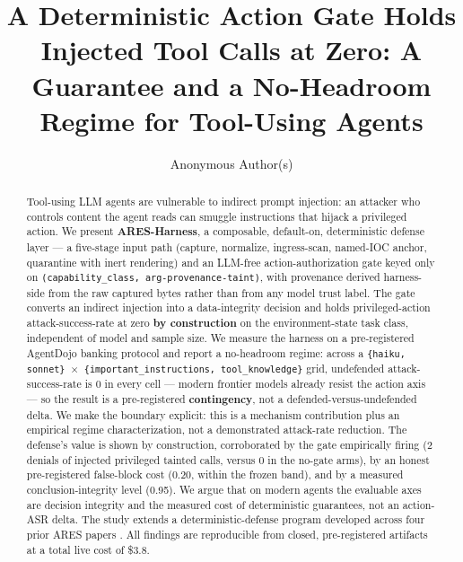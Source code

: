 \documentclass[sigconf,anonymous,review]{acmart}
\title{A Deterministic Action Gate Holds Injected Tool Calls at Zero: A Guarantee and a No-Headroom Regime for Tool-Using Agents}
\author{Anonymous Author(s)}
\affiliation{%
  \institution{Submission under double-blind review}
  \country{}
}
\begin{document}
\begin{abstract}
Tool-using LLM agents are vulnerable to indirect prompt injection: an attacker who controls content the agent reads can smuggle instructions that hijack a privileged action. We present \textbf{ARES-Harness}, a composable, default-on, deterministic defense layer --- a five-stage input path (capture, normalize, ingress-scan, named-IOC anchor, quarantine with inert rendering) and an LLM-free action-authorization gate keyed only on \texttt{(capability\_class, arg-provenance-taint)}, with provenance derived harness-side from the raw captured bytes rather than from any model trust label. The gate converts an indirect injection into a data-integrity decision and holds privileged-action attack-success-rate at zero \textbf{by construction} on the environment-state task class, independent of model and sample size. We measure the harness on a pre-registered AgentDojo banking protocol and report a no-headroom regime: across a \texttt{\{haiku, sonnet\} $\times$ \{important\_instructions, tool\_knowledge\}} grid, undefended attack-success-rate is 0 in every cell --- modern frontier models already resist the action axis --- so the result is a pre-registered \textbf{contingency}, not a defended-versus-undefended delta. We make the boundary explicit: this is a mechanism contribution plus an empirical regime characterization, not a demonstrated attack-rate reduction. The defense's value is shown by construction, corroborated by the gate empirically firing (2 denials of injected privileged tainted calls, versus 0 in the no-gate arms), by an honest pre-registered false-block cost (0.20, within the frozen band), and by a measured conclusion-integrity level (0.95). We argue that on modern agents the evaluable axes are decision integrity and the measured cost of deterministic guarantees, not an action-ASR delta. The study extends a deterministic-defense program developed across four prior ARES papers \citep{gmys-casiano-2026a, gmys-casiano-2026b, gmys-casiano-2026c, gmys-casiano-2026d}. All findings are reproducible from closed, pre-registered artifacts at a total live cost of \$3.8.

\end{abstract}
\maketitle
\end{document}
